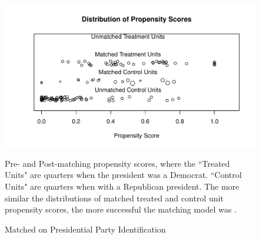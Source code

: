 \documentclass[a4paper]{article}\usepackage{graphicx, color}
\makeatletter
\def\maxwidth{ %
  \ifdim\Gin@nat@width>\linewidth
    \linewidth
  \else
    \Gin@nat@width
  \fi
}
\newenvironment{knitrout}{}{} %
\makeatother
\begin{document}
\begin{figure}[h]
  \caption{Matched on Presidential Party Identification}
  \label{PresPropensityScores}
\begin{knitrout}
\color{fgcolor}\includegraphics[width=\maxwidth]{figure/PresPropensity} 
\end{knitrout}

  \begin{singlespace}
      {\scriptsize{Pre- and Post-matching propensity scores, where the ``Treated Units" are quarters when the president was a Democrat. ``Control Units" are quarters when with a Republican president. The more similar the distributions of matched treated and control unit propensity scores, the more successful the matching model was \cite[17]{Hollyer2012}.}}
  \end{singlespace}
\end{figure}
\end{document}
